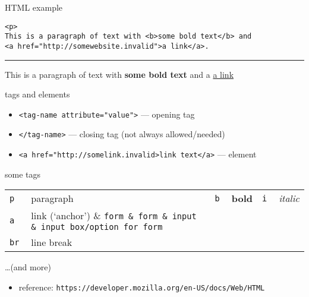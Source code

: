 \begin{frame}[fragile,label=HTMLSample]{HTML example}
\begin{verbatim}
<p>
This is a paragraph of text with <b>some bold text</b> and
<a href="http://somewebsite.invalid">a link</a>.
\end{verbatim}
\hrule
{
\small
This is a paragraph of text with \textbf{some bold text} and
a \textcolor{blue!70!black}{\underline{a link}}
}
\end{frame}

\begin{frame}[fragile,label=tagEx]{tags and elements}
\begin{itemize}
\item \verb|<tag-name attribute="value">| --- opening tag
\item \verb|</tag-name>| --- closing tag (not always allowed/needed)
\item \verb|<a href="http://somelink.invalid>link text</a>| --- element
\end{itemize}
\end{frame}

\begin{frame}[fragile,label=tagList]{some tags}
\begin{tabular}{ll|ll|ll}
\tt p & paragraph & \tt b & \textbf{bold} & \tt i & \textit{italic} \\
\tt a & link (`anchor') \& \tt form \& form \& \tt input \& input box/option for form \\
\tt br & line break \\
\end{tabular}
\ldots (and more)
\begin{itemize}
\item reference: \texttt{https://developer.mozilla.org/en-US/docs/Web/HTML}
\end{itemize}
\end{frame}
